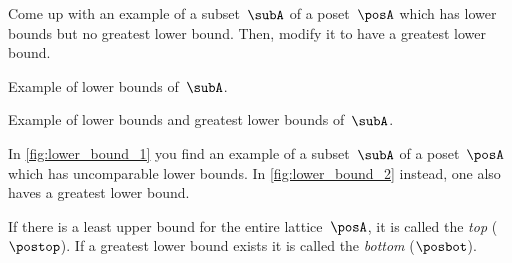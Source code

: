 \begin{exercise}
	Come up with an example of a subset~$\subA$ of a poset~$\posA$ which has lower bounds but no greatest lower bound.
	Then, modify it to have a greatest lower bound.
\end{exercise}

\begin{solution}
	\begin{marginfigure}
		\centering
		\caption{Example of lower bounds of~$\subA$. \label{fig:lower_bound_1}}
	\end{marginfigure}
	\begin{marginfigure}
		\centering
		\includesag{lower_bound_2}
		\caption{Example of lower bounds and greatest lower bounds of~$\subA$. \label{fig:lower_bound_2}}
	\end{marginfigure}

	In \cref{fig:lower_bound_1} you find an example of a subset~$\subA$ of a poset~$\posA$ which has uncomparable lower bounds.
	In \cref{fig:lower_bound_2} instead, one also haves a greatest lower bound.
\end{solution}

\begin{definition}
	\label{def:top}
	\label{def:bot}
	If there is a least upper bound for the entire lattice~$\posA$, it is called the \emph{top} ($\postop$).
	If a greatest lower bound exists it is called the \emph{bottom} ($\posbot$).
\end{definition}